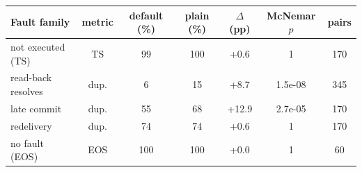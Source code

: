\begin{tabular}{lcccccc}
\toprule
Fault family & metric & default (\%) & plain (\%) & $\Delta$ (pp) & McNemar $p$ & pairs \\
\midrule
not executed (TS) & TS & 99 & 100 & +0.6 & 1 & 170 \\
read-back resolves & dup. & 6 & 15 & +8.7 & 1.5e-08 & 345 \\
late commit & dup. & 55 & 68 & +12.9 & 2.7e-05 & 170 \\
redelivery & dup. & 74 & 74 & +0.6 & 1 & 170 \\
no fault (EOS) & EOS & 100 & 100 & +0.0 & 1 & 60 \\
\bottomrule
\end{tabular}